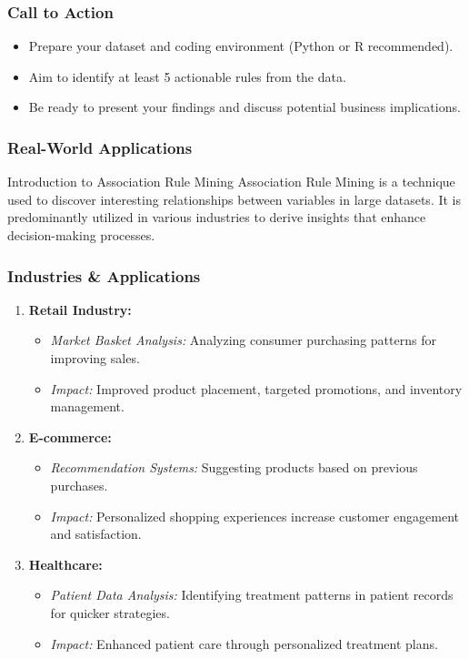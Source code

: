 \documentclass{beamer}
\begin{document}
\begin{frame}[fragile]
    \frametitle{Call to Action}
    \begin{itemize}
        \item Prepare your dataset and coding environment (Python or R recommended).
        \item Aim to identify at least 5 actionable rules from the data.
        \item Be ready to present your findings and discuss potential business implications.
    \end{itemize}
\end{frame}

\begin{frame}[fragile]
    \frametitle{Real-World Applications}
    \begin{block}{Introduction to Association Rule Mining}
        Association Rule Mining is a technique used to discover interesting relationships between variables in large datasets. It is predominantly utilized in various industries to derive insights that enhance decision-making processes.
    \end{block}
\end{frame}

\begin{frame}[fragile]
    \frametitle{Industries \& Applications}
    \begin{enumerate}
        \item \textbf{Retail Industry:}
            \begin{itemize}
                \item \textit{Market Basket Analysis:} Analyzing consumer purchasing patterns for improving sales.
                \item \textit{Impact:} Improved product placement, targeted promotions, and inventory management.
            \end{itemize}
        
        \item \textbf{E-commerce:}
            \begin{itemize}
                \item \textit{Recommendation Systems:} Suggesting products based on previous purchases.
                \item \textit{Impact:} Personalized shopping experiences increase customer engagement and satisfaction.
            \end{itemize}
        
        \item \textbf{Healthcare:}
            \begin{itemize}
                \item \textit{Patient Data Analysis:} Identifying treatment patterns in patient records for quicker strategies.
                \item \textit{Impact:} Enhanced patient care through personalized treatment plans.
            \end{itemize}
    \end{enumerate}
\end{frame}
\end{document}

